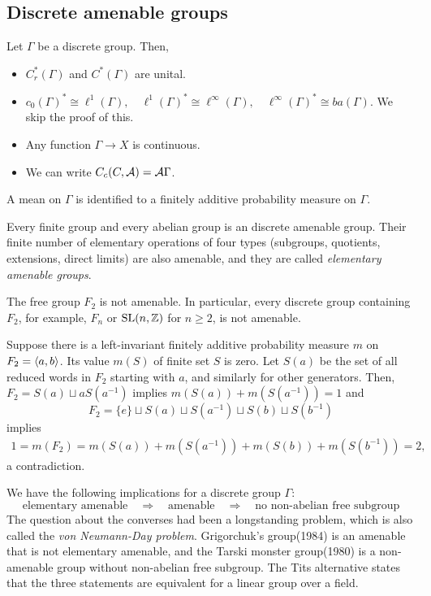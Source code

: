 \documentclass{../../../small}
\begin{document}
\subsection{Discrete amenable groups}


Let $\Gamma$ be a discrete group.
Then,
\begin{itemize}
\item $C_r^*(\Gamma)$ and $C^*(\Gamma)$ are unital.
\item $c_0(\Gamma)^*\cong\ell^1(\Gamma),
\quad\ell^1(\Gamma)^*\cong\ell^\infty(\Gamma),
\quad\ell^\infty(\Gamma)^*\cong ba(\Gamma)$.
We skip the proof of this.
\item Any function $\Gamma\to X$ is continuous.
\item We can write $C_c(C,\mathcal{A})=\mathcal{A}\Gamma$.
\end{itemize}
A mean on $\Gamma$ is identified to a finitely additive probability measure on $\Gamma$.

\begin{ex}
\end{ex}

\begin{ex}
Every finite group and every abelian group is an discrete amenable group.
Their finite number of elementary operations of four types (subgroups, quotients, extensions, direct limits) are also amenable, and they are called \emph{elementary amenable groups}.
\end{ex}

\begin{ex}
The free group $F_2$ is not amenable.
In particular, every discrete group containing $F_2$, for example, $F_n$ or $\mathrm{SL}(n,\mathbb{Z})$ for $n\ge2$, is not amenable.
\end{ex}
\begin{pf}
Suppose there is a left-invariant finitely additive probability measure $m$ on $F_2=\langle a,b\rangle$.
Its value $m(S)$ of finite set $S$ is zero.
Let $S(a)$ be the set of all reduced words in $F_2$ starting with $a$, and similarly for other generators.
Then, $F_2=S(a)\sqcup aS(a^{-1})$ implies $m(S(a))+m(S(a^{-1}))=1$ and
\[F_2=\{e\}\sqcup S(a)\sqcup S(a^{-1})\sqcup S(b)\sqcup S(b^{-1})\]
implies
\begin{align*}
1=m(F_2)=m(S(a))+m(S(a^{-1}))+m(S(b))+m(S(b^{-1}))=2,
\end{align*}
a contradiction.
\end{pf}

\begin{rmk}
We have the following implications for a discrete group $\Gamma$:
\[\text{elementary amenable}\quad\Longrightarrow\quad\text{amenable}\quad\Longrightarrow\quad\text{no non-abelian free subgroup}\]
The question about the converses had been a longstanding problem, which is also called the \emph{von Neumann-Day problem}.
Grigorchuk's group(1984) is an amenable that is not elementary amenable, and the Tarski monster group(1980) is a non-amenable group without non-abelian free subgroup.
The Tits alternative states that the three statements are equivalent for a linear group over a field.
\end{rmk}
\end{document}
